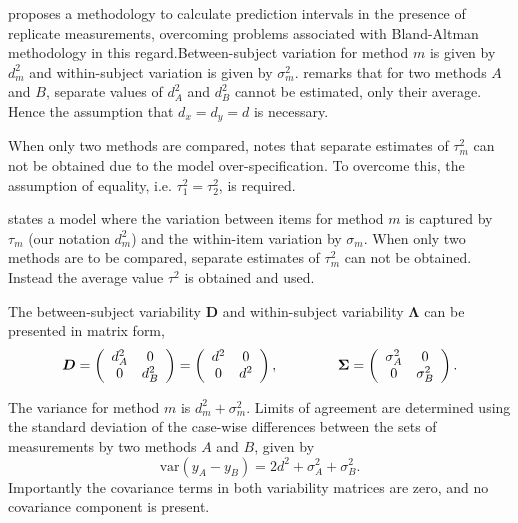 \documentclass[12pt, a4paper]{report}
\theoremstyle{plain}
\theoremstyle{definition}
\theoremstyle{remark}
\begin{document}
\citet{BXC2008} proposes a methodology to calculate prediction intervals in the presence of replicate measurements, overcoming problems associated with Bland-Altman methodology in this regard.Between-subject variation for method $m$ is given by $d^2_{m}$ and within-subject variation is given by $\sigma^2_{m}$.  \citet{BXC2008} remarks that for two methods $A$ and $B$, separate values of $d^2_{A}$ and $d^2_{B}$ cannot be estimated, only their average. Hence the assumption that $d_{x}= d_{y}= d$ is necessary. %

When only two methods are compared, \citet{BXC2008} notes that separate estimates of $\tau^2_m$ can not be obtained due to the model over-specification. To overcome this, the assumption of equality, i.e. $\tau^2_1 = \tau^2_2$, is required.


	\citet{BXC2008} states a model where the variation between items for method $m$ is captured by $\tau_m$ (our notation $d^2_m$) and the within-item variation by $\sigma_m$. When only two methods are to be compared, separate estimates of $\tau^2_m$ can not be obtained. Instead the average value $\tau^2$ is obtained and used.
	
	
The between-subject variability $\boldsymbol{D}$ and within-subject variability $\boldsymbol{\Lambda}$ can be presented in matrix form,\[
\boldsymbol{D} = \left(%
\begin{array}{cc}
d^2_{A}& 0 \\
0 & d^2_{B} \\
\end{array}%
\right)=\left(%
\begin{array}{cc}
d^2& 0 \\
0 & d^2\\
\end{array}%
\right),
\hspace{1.5cm}
\boldsymbol{\Sigma} = \left(%
\begin{array}{cc}
\sigma^2_{A}& 0 \\
0 & \sigma^2_{B} \\
\end{array}%
\right).
\]

The variance for method $m$ is $d^2_{m}+\sigma^2_{m}$. Limits of agreement are determined using the standard deviation of the case-wise differences between the sets of measurements by two methods $A$ and $B$, given by
\begin{equation}
	\mbox{var} (y_{A}-y_{B}) = 2d^2 + \sigma^2_{A}+ \sigma^2_{B}.
\end{equation}
Importantly the covariance terms in both variability matrices are zero, and no covariance component is present.
\end{document}
